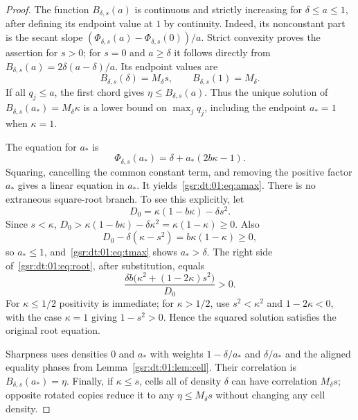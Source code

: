 \documentclass[11pt,letterpaper]{article}
\numberwithin{equation}{section}
\theoremstyle{definition}
\theoremstyle{remark}
\newcommand{\1}{\mathbf 1}
\newcommand{\ph}{\Phi_{\delta,s}}
\newcommand{\BB}{B_{\delta,s}}
\begin{document}
\begin{proof}
The function $\BB(a)$ is continuous and strictly increasing for
$\delta\le a\le1$, after defining its endpoint value at $1$ by continuity.
Indeed, its nonconstant part is the secant slope
$(\ph(a)-\ph(0))/a$. Strict convexity proves the assertion for $s>0$;
for $s=0$ and $a\ge\delta$ it follows directly from
$\BB(a)=2\delta(a-\delta)/a$. Its endpoint values are
\[
 \BB(\delta)=M_\delta s,\qquad \BB(1)=M_\delta.
\]
If all $q_j\le a$, the first chord gives $\eta\le\BB(a)$.
Thus the unique solution of $\BB(a_*)=M_\delta\kappa$ is a lower bound
on $\max_jq_j$, including the endpoint $a_*=1$ when $\kappa=1$.

The equation for $a_*$ is
\begin{equation}\label{gsr:dt:01:eq:root}
 \ph(a_*)=\delta+a_*(2b\kappa-1).
\end{equation}
Squaring, cancelling the common constant term, and removing the positive
factor $a_*$ gives a linear equation in $a_*$. It yields~\eqref{gsr:dt:01:eq:amax}.
There is no extraneous square-root branch. To see this explicitly, let
\[
 D_0=\kappa(1-b\kappa)-\delta s^2.
\]
Since $s<\kappa$,
$D_0>\kappa(1-b\kappa)-\delta\kappa^2=\kappa(1-\kappa)\ge0$.
Also
\[
 D_0-\delta(\kappa-s^2)=b\kappa(1-\kappa)\ge0,
\]
so $a_*\le1$, and~\eqref{gsr:dt:01:eq:tmax} shows $a_*>\delta$.
The right side of~\eqref{gsr:dt:01:eq:root}, after substitution, equals
\[
 \frac{\delta b\bigl(\kappa^2+(1-2\kappa)s^2\bigr)}{D_0}>0.
\]
For $\kappa\le1/2$ positivity is immediate; for $\kappa>1/2$, use
$s^2<\kappa^2$ and $1-2\kappa<0$, with the case $\kappa=1$
giving $1-s^2>0$. Hence the squared solution satisfies the original
root equation.

Sharpness uses densities $0$ and $a_*$ with weights
$1-\delta/a_*$ and $\delta/a_*$ and the aligned equality phases from
Lemma~\ref{gsr:dt:01:lem:cell}. Their correlation is $\BB(a_*)=\eta$.
Finally, if $\kappa\le s$, cells all of density $\delta$ can have
correlation $M_\delta s$; opposite rotated copies reduce it to any
$\eta\le M_\delta s$ without changing any cell density.
\end{proof}
\end{document}
